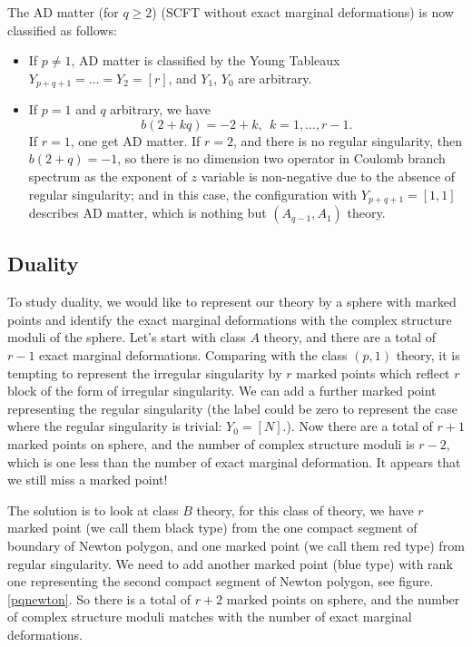 \documentclass[a4paper,11pt]{article}
\begin{document}
 The AD matter (for $q\geq 2$) (SCFT without exact marginal deformations) is now classified as follows:
 \begin{itemize}
 \item If $p\neq 1$,  AD matter is classified by the Young Tableaux $Y_{p+q+1}=\ldots=Y_2=[r]$, and $Y_1$, $Y_0$ are arbitrary.
\item If $p=1$ and $q$ arbitrary, we have 
\begin{equation}
b(2+k q)=-2+k,~~k=1,\ldots, r-1. 
\end{equation}
If $r=1$, one get AD matter. If $r=2$, and there is no regular singularity, then $b(2+q)=-1$, so there is no dimension two operator in Coulomb branch spectrum as 
the exponent of $z$ variable is non-negative due to the absence of regular singularity; and in this case, the configuration with $Y_{p+q+1}=[1,1]$ describes AD matter, which 
is nothing but $(A_{q-1}, A_1)$ theory. 
 

\end{itemize}

\subsection{Duality}
To study duality, we would like to represent our theory by a sphere with marked points and identify the exact marginal deformations with 
the complex structure moduli of the sphere.  Let's start with class $A$ theory, and there are a total of $r-1$ exact marginal deformations. Comparing 
with the class $(p,1)$ theory, it is tempting to represent the irregular singularity by $r$ marked points which reflect $r$ block of the form of irregular singularity.  
We can add a further marked point representing the regular singularity (the label could be zero to represent the case where the regular
singularity is trivial: $Y_0=[N]$.). Now there are a total of $r+1$ marked points on sphere, and the number of complex structure moduli is $r-2$, which is 
one less than the number of exact marginal deformation. 
It appears that we still miss a marked point! 

The solution is to look at class $B$ theory, for this class of theory,  we have $r$ marked point (we call them black type) from the one compact segment of boundary of 
Newton polygon, and one marked point (we call them red type) from regular singularity.  We need to add another marked point (blue type) with rank one representing the second compact segment of 
Newton polygon, see figure. \ref{pqnewton}. So there is a total of $r+2$ marked points on sphere, and the number of complex structure moduli matches with 
the number of exact marginal deformations. 
\end{document}
